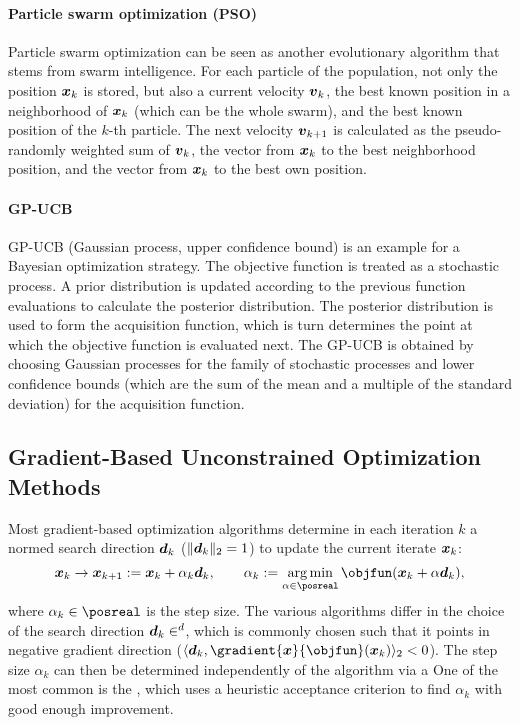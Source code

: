 \paragraph{Particle swarm optimization (PSO)}

Particle swarm optimization
can be seen as another evolutionary algorithm
that stems from swarm intelligence.
For each particle of the population,
not only the position ${\boldsymbol{x}}_k$ is stored,
but also a current velocity ${\boldsymbol{v}}_k$,
the best known position in a neighborhood of ${\boldsymbol{x}}_k$
(which can be the whole swarm), and
the best known position of the $k$-th particle.
The next velocity ${\boldsymbol{v}}_{k+1}$ is calculated as
the pseudo-randomly weighted sum of ${\boldsymbol{v}}_k$,
the vector from ${\boldsymbol{x}}_k$ to the best neighborhood position, and
the vector from ${\boldsymbol{x}}_k$ to the best own position.

\paragraph{GP-UCB}

GP-UCB (Gaussian process, upper confidence bound)
 is an example
for a Bayesian optimization strategy.
The objective function is treated as a stochastic process.
A prior distribution is updated according to the previous function
evaluations to calculate the posterior distribution.
The posterior distribution is used to form the acquisition function,
which is turn determines the point at which the objective
function is evaluated next.
The GP-UCB is obtained by choosing
Gaussian processes for the family of stochastic processes and
lower confidence bounds (which are the sum of the mean
and a multiple of the standard deviation) for the acquisition function.



\subsection{Gradient-Based Unconstrained Optimization Methods}
\label{sec:512gradientBasedUnconstrained}

Most gradient-based optimization algorithms determine in
each iteration $k$ a normed search direction ${\boldsymbol{d}}_k$
($\norm[2]{\*d_k} = 1$) to update the current iterate ${\boldsymbol{x}}_k$:
\begin{equation}
  \*x_k
  \to \*x_{k+1}
  := \*x_k + \alpha_k \*d_k,\qquad
  \alpha_k
  := \argmin_{\alpha \in \posreal} \objfun(\*x_k + \alpha \*d_k),
\end{equation}
where $\alpha_k \in \posreal$ is the step size.
The various algorithms differ in the choice of the search direction
$\*d_k \in \real^d$,
which is commonly chosen such that it points in negative gradient
direction ($\innerprod[2]{\*d_k}{\gradient{\*x}{\objfun}(\*x_k)} < 0$).
The step size $\alpha_k$ can then be determined independently of the
algorithm via a 
One of the most common is the 
,
which uses a heuristic acceptance criterion
to find $\alpha_k$ with good enough improvement.

